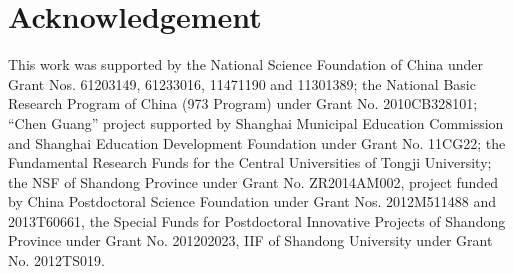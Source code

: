 \documentclass[review]{elsarticle}
\begin{document}
\section*{Acknowledgement}
This work was supported by the National Science Foundation of China under Grant Nos. 61203149, 61233016, 11471190 and 11301389;
the National Basic Research Program of China (973 Program) under Grant No. 2010CB328101; ``Chen Guang'' project supported by Shanghai Municipal Education Commission and Shanghai Education Development Foundation under Grant No. 11CG22; the Fundamental Research Funds for the Central Universities of Tongji University; the NSF of Shandong Province under Grant No. ZR2014AM002, project funded by China Postdoctoral Science Foundation under Grant Nos. 2012M511488 and 2013T60661, the Special Funds for Postdoctoral Innovative Projects of Shandong Province under Grant No. 201202023, IIF of Shandong University under Grant No. 2012TS019.
\end{document}
